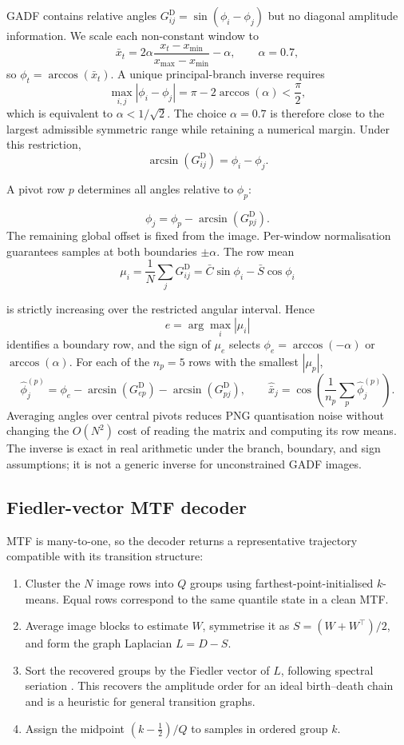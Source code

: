 \documentclass[10pt,a4paper,parskip=half-]{scrartcl}
\begin{document}
GADF contains relative angles \(G^{\mathrm D}_{ij}=\sin(\phi_i-\phi_j)\) but no diagonal amplitude information. We scale each non-constant window to
\[
\bar x_t=2\alpha\frac{x_t-x_{\min}}{x_{\max}-x_{\min}}-\alpha,
\qquad \alpha=0.7,
\]
so \(\phi_t=\arccos(\bar x_t)\). A unique principal-branch inverse requires
\[
\max_{i,j}|\phi_i-\phi_j|
=\pi-2\arccos(\alpha)<\frac{\pi}{2},
\]
which is equivalent to \(\alpha<1/\sqrt2\). The choice \(\alpha=0.7\) is therefore close to the largest admissible symmetric range while retaining a numerical margin. Under this restriction,
\[
\arcsin(G^{\mathrm D}_{ij})=\phi_i-\phi_j.
\]

A pivot row \(p\) determines all angles relative to \(\phi_p\):

\[
\phi_j=\phi_p-\arcsin(G^{\mathrm D}_{pj}).
\]
The remaining global offset is fixed from the image. Per-window normalisation guarantees samples at both boundaries \(\pm\alpha\). The row mean
\[
\mu_i=\frac1N\sum_jG^{\mathrm D}_{ij}
=\bar C\sin\phi_i-\bar S\cos\phi_i
\]

is strictly increasing over the restricted angular interval. Hence
\[
e=\arg\max_i|\mu_i|
\]
identifies a boundary row, and the sign of \(\mu_e\) selects \(\phi_e=\arccos(-\alpha)\) or \(\arccos(\alpha)\). For each of the \(n_p=5\) rows with the smallest \(|\mu_p|\),
\[
\hat\phi^{(p)}_j
=\phi_e-\arcsin(G^{\mathrm D}_{ep})-\arcsin(G^{\mathrm D}_{pj}),
\qquad
\hat{\bar x}_j=
\cos\left(\frac1{n_p}\sum_{p}\hat\phi^{(p)}_j\right).
\]
Averaging angles over central pivots reduces PNG quantisation noise without changing the \(O(N^2)\) cost of reading the matrix and computing its row means. The inverse is exact in real arithmetic under the branch, boundary, and sign assumptions; it is not a generic inverse for unconstrained GADF images.

\subsection{Fiedler-vector MTF decoder}
\label{sec:mtf_reconstruction_method}

MTF is many-to-one, so the decoder returns a representative trajectory compatible with its transition structure:

\begin{enumerate}
\item Cluster the \(N\) image rows into \(Q\) groups using farthest-point-initialised \(k\)-means. Equal rows correspond to the same quantile state in a clean MTF.
\item Average image blocks to estimate \(W\), symmetrise it as \(S=(W+W^\top)/2\), and form the graph Laplacian \(L=D-S\).
\item Sort the recovered groups by the Fiedler vector of \(L\), following spectral seriation \cite{Atkins1998}. This recovers the amplitude order for an ideal birth--death chain and is a heuristic for general transition graphs.
\item Assign the midpoint \((k-\tfrac12)/Q\) to samples in ordered group \(k\).
\end{enumerate}
\end{document}
